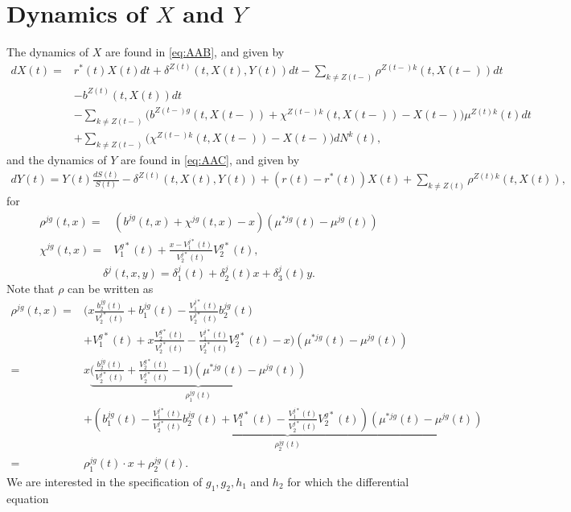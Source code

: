 \documentclass[12pt]{article}
\theoremstyle{my_thm}
\begin{document}
\section{Dynamics of $X$ and $Y$}
\label{seq:Dyn}
The dynamics of $X$ are found in \eqref{eq:AAB}, and given by
\begin{align*}
dX(t)=&
r^*(t)X(t)dt
 +\delta^{Z(t)}(t,X(t),Y(t))  dt- \sum_{k \neq Z(t-)} \rho^{Z(t-)k}(t,X(t-)) dt
 \nonumber 
\\
\nonumber
&- b^{Z(t)}(t,X(t)) dt
\\
&- \sum_{k\neq Z(t-)}\bigg(b^{Z(t-)g}(t,X(t-))+\chi^{Z(t-)k}(t,X(t-))-X(t-) \bigg) \mu^{Z(t)k}(t)dt
\\
&+ \sum_{k\neq Z(t-)}\bigg(\chi^{Z(t-)k}(t,X(t-))-X(t-) \bigg)  dN^k(t),
\end{align*}
and the dynamics of $Y$ are found in \eqref{eq:AAC}, and given by
\begin{align*}
dY(t)=Y(t)\frac{dS(t)}{S(t)}-\delta^{Z(t)}(t,X(t),Y(t)) + (r(t)-r^*(t)) X(t) + \sum_{k \neq Z(t)} \rho^{Z(t)k}(t,X(t)),
\end{align*}
for
\begin{align*}
\rho^{jg}(t,x)=&(b^{jg}(t,x)+ \chi^{jg}(t,x)-x) (\mu^{*jg}(t)-\mu^{jg}(t))
\\
\chi^{jg}(t,x)=& V^{g*}_1(t) + \frac{x-V^{j*}_1(t)}{V^{j*}_2(t)}V^{g*}_2(t),
\end{align*}
\begin{equation*}
\delta^j(t,x,y)=\delta_1^j(t)+\delta_2^j(t)x+\delta_3^j(t)y.
\end{equation*}
Note that $\rho$ can be written as
\begin{align*}
\rho^{jg}(t,x)=& 
\bigg( x \frac{b_2^{jg}(t)}{V_2^{j*}(t)} + b_1^{jg}(t) -  \frac{V_1^{j*}(t)}{V_2^{j*}(t)}b_2^{jg}(t)
\\
& + V^{g*}_1(t) + x\frac{V^{g*}_2(t)}{V^{j*}_2(t)}-\frac{V^{j*}_1(t)}{V^{j*}_2(t)}V^{g*}_2(t)-x \bigg) (\mu^{*jg}(t)-\mu^{jg}(t))
\\
=& 
x\underbrace{\bigg(  \frac{b_2^{jg}(t)}{V_2^{j*}(t)} + \frac{V^{g*}_2(t)}{V^{j*}_2(t)}-1 \bigg) (\mu^{*jg}(t)-\mu^{jg}(t))}_{\rho^{jg}_1(t)}
\\
&+
\underbrace{\left( b_1^{jg}(t) -  \frac{V_1^{j*}(t)}{V_2^{j*}(t)}b_2^{jg}(t)
+ V^{g*}_1(t)
-\frac{V^{j*}_1(t)}{V^{j*}_2(t)}V^{g*}_2(t) \right)(\mu^{*jg}(t)-\mu^{jg}(t))}_{\rho^{jg}_2(t)}
\\
=&
\rho_1^{jg}(t)\cdot x+\rho_2^{jg}(t).
\end{align*}
We are interested in the specification of $g_1,g_2,h_1$ and $h_2$ for which the differential equation
\end{document}
